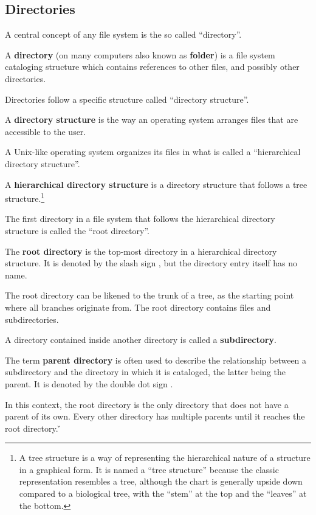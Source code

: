 \subsection{Directories}

A central concept of any file system is the so called ``directory''.

A \textbf{directory} (on many computers also known as \textbf{folder}) is a file system cataloging structure which
contains references to other files, and possibly other directories.
\ed

Directories follow a specific structure called ``directory structure''.

A \textbf{directory structure} is the way an operating system arranges files that are accessible to the user.
\ed

A Unix-like operating system organizes its files in what is called a ``hierarchical directory structure''.

A \textbf{hierarchical directory structure} is a directory structure that follows a tree structure.\footnote{A tree
structure is a way of representing the hierarchical nature of a structure in a graphical form. It is named a
``tree structure'' because the classic representation resembles a tree, although the chart is generally upside down
compared to a biological tree, with the ``stem'' at the top and the ``leaves'' at the bottom.}
\ed

The first directory in a file system that follows the hierarchical directory structure is called the ``root directory''.

The \textbf{root directory} is the top-most directory in a hierarchical directory structure. It is denoted by the slash
sign \code{/}, but the directory entry itself has no name.
\ed

The root directory can be likened to the trunk of a tree, as the starting point where all branches originate from. The
root directory contains files and subdirectories.

\bd[Subdirectory]
A directory contained inside another directory is called a \textbf{subdirectory}.
\ed

The term \textbf{parent directory} is often used to describe the relationship between a subdirectory and the
directory in which it is cataloged, the latter being the parent. It is denoted by the double dot sign .
\ed

In this context, the root directory is the only directory that does not have a parent of its own. Every other directory
has multiple parents until it reaches the root directory. \v

